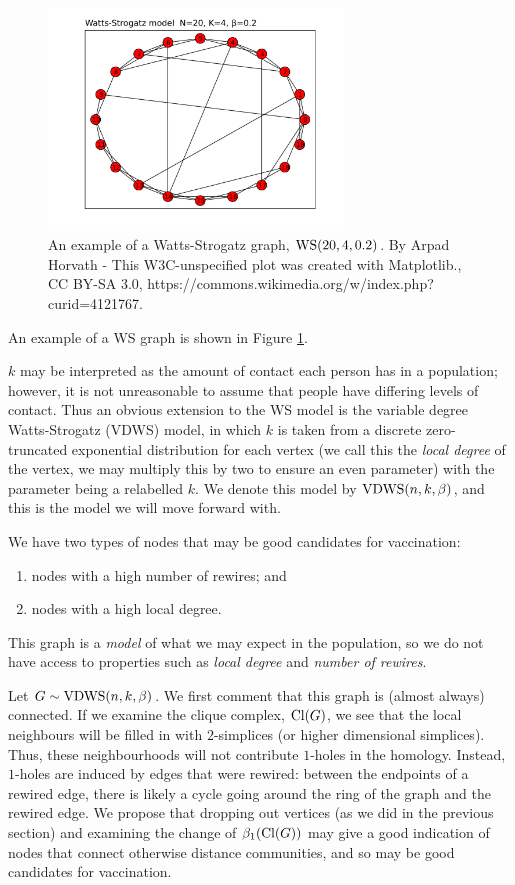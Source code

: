\begin{figure}
    \centering 
    \includegraphics[width=0.7\textwidth]{content/5-applications/images/watts-strogatz}
    \caption{An example of a Watts-Strogatz graph, $\operatorname{WS}(20, 4, 0.2)$. By Arpad Horvath - This W3C-unspecified plot was created with Matplotlib., CC BY-SA 3.0, https://commons.wikimedia.org/w/index.php?curid=4121767.}
    \label{fig:watts-strogatz}
\end{figure}

An example of a WS graph is shown in Figure \ref{fig:watts-strogatz}.

$k$ may be interpreted as the amount of contact each person has in a population; however, it is not unreasonable to assume that people have differing levels of contact. Thus an obvious extension to the WS model is the variable degree Watts-Strogatz (VDWS) model, in which $k$ is taken from a discrete zero-truncated exponential distribution for each vertex (we call this the \emph{local degree} of the vertex, we may multiply this by two to ensure an even parameter) with the parameter being a relabelled $k$. We denote this model by $\operatorname{VDWS}(n, k, \beta)$, and this is the model we will move forward with.

We have two types of nodes that may be good candidates for vaccination:
\begin{enumerate}
    \item nodes with a high number of rewires; and 
    \item nodes with a high local degree.
\end{enumerate}
This graph is a \emph{model} of what we may expect in the population, so we do not have access to properties such as \emph{local degree} and \emph{number of rewires}.

Let $G \sim \operatorname{VDWS}(n, k, \beta)$. We first comment that this graph is (almost always) connected. If we examine the clique complex, $\operatorname{Cl}(G)$, we see that the local neighbours will be filled in with $2$-simplices (or higher dimensional simplices). Thus, these neighbourhoods will not contribute $1$-holes in the homology. Instead, $1$-holes are induced by edges that were rewired: between the endpoints of a rewired edge, there is likely a cycle going around the ring of the graph and the rewired edge. We propose that dropping out vertices (as we did in the previous section) and examining the change of $\beta_1(\operatorname{Cl}(G))$ may give a good indication of nodes that connect otherwise distance communities, and so may be good candidates for vaccination. 

